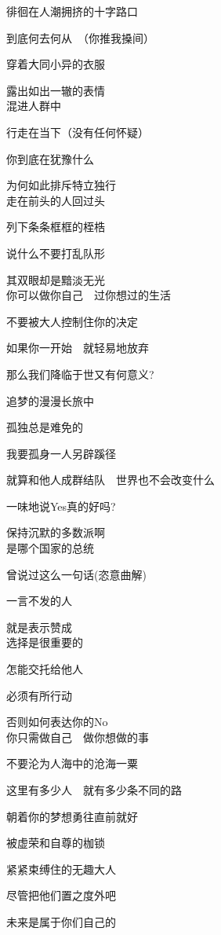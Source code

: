 徘徊在人潮拥挤的十字路口

到底何去何从　（你推我搡间）

穿着大同小异的衣服

露出如出一辙的表情
\\

混进人群中

行走在当下（没有任何怀疑）

你到底在犹豫什么

为何如此排斥特立独行
\\

走在前头的人回过头

列下条条框框的桎梏

说什么不要打乱队形

其双眼却是黯淡无光
\\

你可以做你自己　过你想过的生活

不要被大人控制住你的决定

如果你一开始　就轻易地放弃

那么我们降临于世又有何意义?

追梦的漫漫长旅中

孤独总是难免的

我要孤身一人另辟蹊径

就算和他人成群结队　世界也不会改变什么

一味地说Yes真的好吗?

保持沉默的多数派啊
\\

是哪个国家的总统

曾说过这么一句话(恣意曲解)

一言不发的人

就是表示赞成
\\

选择是很重要的

怎能交托给他人

必须有所行动

否则如何表达你的No
\\

你只需做自己　做你想做的事

不要沦为人海中的沧海一粟

这里有多少人　就有多少条不同的路

朝着你的梦想勇往直前就好

被虚荣和自尊的枷锁

紧紧束缚住的无趣大人

尽管把他们置之度外吧

未来是属于你们自己的

